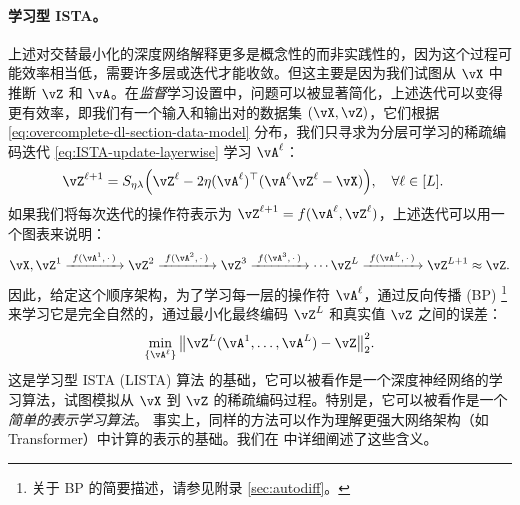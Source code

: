 \documentclass[../../book-main_zh.tex]{subfiles}
\begin{document}
\paragraph{学习型 ISTA。} 上述对交替最小化的深度网络解释更多是概念性的而非实践性的，因为这个过程可能效率相当低，需要许多层或迭代才能收敛。但这主要是因为我们试图从 \(\vX\) 中推断 \(\vZ\) 和 \(\vA\)。在\textit{监督}学习设置中，问题可以被显著简化，上述迭代可以变得更有效率，即我们有一个输入和输出对的数据集 \((\vX, \vZ)\)，它们根据 \eqref{eq:overcomplete-dl-section-data-model} 分布，我们只寻求为分层可学习的稀疏编码迭代 \eqref{eq:ISTA-update-layerwise} 学习 \(\vA^\ell\)：
\begin{align}
    & \vZ^{\ell + 1} = S_{\eta\lambda}\rp{\vZ^{\ell} - 2\eta(\vA^{\ell})^{\top}(\vA^\ell\vZ^{\ell} - \vX)}, \quad \forall \ell \in [L].
\end{align}
如果我们将每次迭代的操作符表示为 $\vZ^{\ell + 1} = f(\vA^\ell, \vZ^\ell)$，上述迭代可以用一个图表来说明：
\begin{equation*}
\vX, \vZ^1 \xrightarrow{\hspace{1mm} f(\vA^1,\,\cdot\,) \hspace{1mm}}  \vZ^2 \xrightarrow{\hspace{1mm} f(\vA^2,\,\cdot\,) \hspace{1mm}}  \vZ^3  \xrightarrow{\hspace{1mm} f(\vA^3,\,\cdot\,) \hspace{1mm}} \cdots \vZ^{L}  \xrightarrow{\hspace{1mm} f(\vA^{L},\,\cdot\,) \hspace{1mm}} \vZ^{L + 1} \approx \vZ.  
\label{eqn:deep-sparse-encoding}
\end{equation*}
因此，给定这个顺序架构，为了学习每一层的操作符 \(\vA^\ell\)，通过反向传播 (BP) \footnote{关于 BP 的简要描述，请参见附录 \ref{sec:autodiff}。} 来学习它是完全自然的，通过最小化最终编码 $\vZ^L$ 和真实值 $\vZ$ 之间的误差：
\begin{equation}\label{eq:lista-training}
    \min_{\{\vA^\ell\}} \big\|\vZ^L(\vA^1, \ldots, \vA^{L}) - \vZ\big\|_2^2.
\end{equation}
这是学习型 ISTA (LISTA) 算法 \cite{gregor2010learning} 的基础，它可以被看作是一个深度神经网络的学习算法，试图模拟从 $\vX$ 到 $\vZ$ 的稀疏编码过程。特别是，它可以被看作是一个\textit{简单的表示学习算法}。
事实上，同样的方法可以作为理解更强大网络架构（如 Transformer）中计算的表示的基础。我们在  中详细阐述了这些含义。
\end{document}
